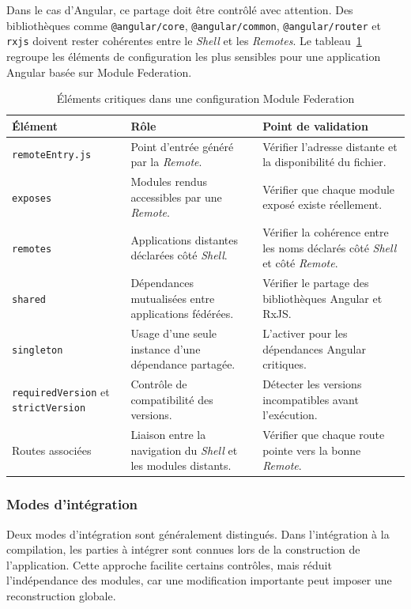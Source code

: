 Dans le cas d'Angular, ce partage doit être contrôlé avec attention. Des bibliothèques comme \texttt{@angular/core}, \texttt{@angular/common}, \texttt{@angular/router} et \texttt{rxjs} doivent rester cohérentes entre le \textit{Shell} et les \textit{Remotes}. Le tableau~\ref{tab:module-federation-elements} regroupe les éléments de configuration les plus sensibles pour une application Angular basée sur Module Federation.

\begingroup
\renewcommand{\arraystretch}{1.08}
\begin{longtable}{|p{3.8cm}|p{5.4cm}|p{5.2cm}|}
\caption{Éléments critiques dans une configuration Module Federation}\label{tab:module-federation-elements}\\
\hline
\textbf{Élément} & \textbf{Rôle} & \textbf{Point de validation} \\
\hline
\texttt{remoteEntry.js} & Point d'entrée généré par la \textit{Remote}. & Vérifier l'adresse distante et la disponibilité du fichier. \\
\hline
\texttt{exposes} & Modules rendus accessibles par une \textit{Remote}. & Vérifier que chaque module exposé existe réellement. \\
\hline
\texttt{remotes} & Applications distantes déclarées côté \textit{Shell}. & Vérifier la cohérence entre les noms déclarés côté \textit{Shell} et côté \textit{Remote}. \\
\hline
\texttt{shared} & Dépendances mutualisées entre applications fédérées. & Vérifier le partage des bibliothèques Angular et RxJS. \\
\hline
\texttt{singleton} & Usage d'une seule instance d'une dépendance partagée. & L'activer pour les dépendances Angular critiques. \\
\hline
\texttt{requiredVersion} et \texttt{strictVersion} & Contrôle de compatibilité des versions. & Détecter les versions incompatibles avant l'exécution. \\
\hline
Routes associées & Liaison entre la navigation du \textit{Shell} et les modules distants. & Vérifier que chaque route pointe vers la bonne \textit{Remote}. \\
\hline
\end{longtable}
\endgroup

\subsubsection{Modes d'intégration}

Deux modes d'intégration sont généralement distingués. Dans l'intégration à la compilation, les parties à intégrer sont connues lors de la construction de l'application. Cette approche facilite certains contrôles, mais réduit l'indépendance des modules, car une modification importante peut imposer une reconstruction globale.

